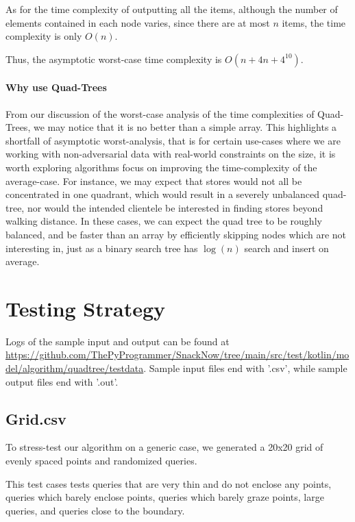 \documentclass[12pt]{article}
\begin{document}
{As for the time complexity of outputting all the items, although the number of elements contained in each node varies, since there are at most $n$ items, the time complexity is only $O(n)$.

Thus, the asymptotic worst-case time complexity is $O(n + 4n + 4^{10})$.

\paragraph{Why use Quad-Trees}

From our discussion of the worst-case analysis of the time complexities of Quad-Trees, we may notice that it is no better than a simple array. This highlights a shortfall of asymptotic worst-analysis, that is for certain use-cases where we are working with non-adversarial data with real-world constraints on the size, it is worth exploring algorithms focus on improving the time-complexity of the average-case. For instance, we may expect that stores would not all be concentrated in one quadrant, which would result in a severely unbalanced quad-tree, nor would the intended clientele be interested in finding stores beyond walking distance. In these cases, we can expect the quad tree to be roughly balanced, and be faster than an array by efficiently skipping nodes which are not interesting in, just as a binary search tree has $\log(n)$ search and insert on average.


\section{Testing Strategy}

Logs of the sample input and output can be found at \url{https://github.com/ThePyProgrammer/SnackNow/tree/main/src/test/kotlin/model/algorithm/quadtree/testdata}. Sample input files end with '.csv', while sample output files end with '.out'.


\subsection{Grid.csv}

To stress-test our algorithm on a generic case, we generated a 20x20 grid of evenly spaced points and randomized queries. 

This test cases tests queries that are very thin and do not enclose any points, queries which barely enclose points, queries which barely graze points, large queries, and queries close to the boundary.

}
\end{document}
